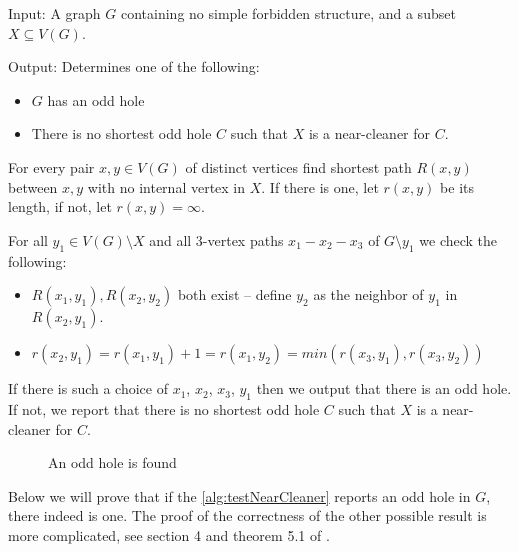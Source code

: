 \begin{alg}
	\label{alg:testNearCleaner}
	Input: A graph $G$ containing no simple forbidden structure, and a subset $X \subseteq V(G)$.

	\noindent Output: Determines one of the following:
	\begin{itemize}
		\item $G$ has an odd hole
		\item There is no shortest odd hole $C$ such that $X$ is a near-cleaner for $C$.
	\end{itemize}
\end{alg}
\begin{algtext2}
	For every pair $x, y \in V(G)$ of distinct vertices find shortest path $R(x, y)$ between $x, y$ with no internal vertex in $X$. If there is one, let $r(x, y)$ be its length, if not, let $r(x, y) = \infty$.

	For all $y_1 \in V(G)\setminus X$ and all 3-vertex paths $x_1-x_2-x_3$ of $G\setminus y_1$ we check the following:
	\begin{itemize}
		\item $R(x_1, y_1), R(x_2, y_2)$ both exist -- define $y_2$ as the neighbor of $y_1$ in $R(x_2, y_1)$.
		\item $r(x_2, y_1) = r(x_1, y_1) + 1 = r(x_1, y_2) = min(r(x_3, y_1), r(x_3, y_2))$ 
	\end{itemize}

	If there is such a choice of $x_1$, $x_2$, $x_3$, $y_1$ then we output that there is an odd hole. If not, we report that there is no shortest odd hole $C$ such that $X$ is a near-cleaner for $C$.
\end{algtext2}

\begin{wrapfigure}{r}{0.35\textwidth}
	
	\caption{An odd hole is found}%
	\vspace{-0.5cm}
\end{wrapfigure}

Below we will prove that if the \cref{alg:testNearCleaner} reports an odd hole in $G$, there indeed is one. The proof of the correctness of the other possible result is more complicated, see section 4 and theorem 5.1 of \cite{MC05}.

